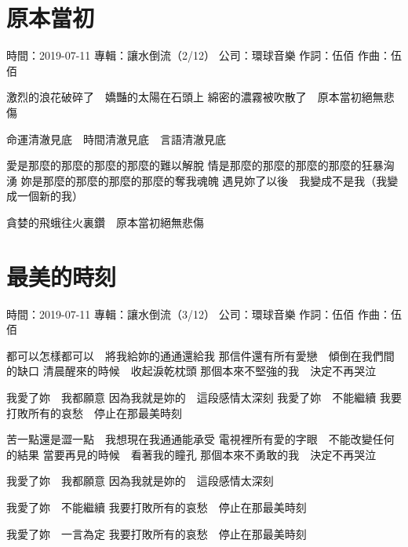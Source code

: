 \documentclass[UTF8,a4paper,oneside,twocolumn,12pt]{ctexbook}
\newcommand{\infopair}[2]{\textbullet #1：#2}
\newcommand{\zc}[1][伍佰]{\infopair{作詞}{#1}}
\newcommand{\zq}[1][伍佰]{\infopair{作曲}{#1}}
\newcommand{\zj}[1]{\infopair{專輯}{#1}}
\newcommand{\sj}[1]{\infopair{時間}{#1}}
\newcommand{\gs}[1]{\infopair{公司}{#1}}
\newenvironment{info}{\begin{flushleft}\kaishu
	}
	{\end{flushleft}\normalsize\yahei\par}
\newenvironment{lyric}{
	}
{}
\begin{document}
\section{原本當初}
\begin{info}
	\sj{2019-07-11}
	\zj{讓水倒流（2/12）}
	\gs{環球音樂}
	\zc
	\zq
\end{info}
\begin{lyric}
	激烈的浪花破碎了　嬌豔的太陽在石頭上
	綿密的濃霧被吹散了　原本當初絕無悲傷

	命運清澈見底　時間清澈見底　言語清澈見底

	愛是那麼的那麼的那麼的那麼的難以解脫
	情是那麼的那麼的那麼的那麼的狂暴洶湧
	妳是那麼的那麼的那麼的那麼的奪我魂魄
	遇見妳了以後　我變成不是我（我變成一個新的我）

	貪婪的飛蛾往火裏鑽　原本當初絕無悲傷
\end{lyric}

\section{最美的時刻}
\begin{info}
	\sj{2019-07-11}
	\zj{讓水倒流（3/12）}
	\gs{環球音樂}
	\zc
	\zq
\end{info}
\begin{lyric}
	都可以怎樣都可以　將我給妳的通通還給我
	那信件還有所有愛戀　傾倒在我們間的缺口
	清晨醒來的時候　收起淚乾枕頭
	那個本來不堅強的我　決定不再哭泣

	我愛了妳　我都願意
	因為我就是妳的　這段感情太深刻
	我愛了妳　不能繼續
	我要打敗所有的哀愁　停止在那最美時刻

	苦一點還是澀一點　我想現在我通通能承受
	電視裡所有愛的字眼　不能改變任何的結果
	當要再見的時候　看著我的瞳孔
	那個本來不勇敢的我　決定不再哭泣

	我愛了妳　我都願意
	因為我就是妳的　這段感情太深刻

	我愛了妳　不能繼續
	我要打敗所有的哀愁　停止在那最美時刻

	我愛了妳　一言為定
	我要打敗所有的哀愁　停止在那最美時刻
\end{lyric}
\end{document}
